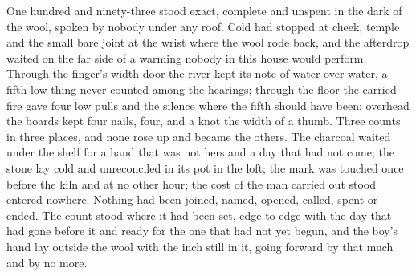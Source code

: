 One hundred and ninety-three stood exact, complete and unspent in the dark of the wool, spoken by nobody under any roof. Cold had stopped at cheek, temple and the small bare joint at the wrist where the wool rode back, and the afterdrop waited on the far side of a warming nobody in this house would perform. Through the finger's-width door the river kept its note of water over water, a fifth low thing never counted among the hearings; through the floor the carried fire gave four low pulls and the silence where the fifth should have been; overhead the boards kept four nails, four, and a knot the width of a thumb. Three counts in three places, and none rose up and became the others. The charcoal waited under the shelf for a hand that was not hers and a day that had not come; the stone lay cold and unreconciled in its pot in the loft; the mark was touched once before the kiln and at no other hour; the cost of the man carried out stood entered nowhere. Nothing had been joined, named, opened, called, spent or ended. The count stood where it had been set, edge to edge with the day that had gone before it and ready for the one that had not yet begun, and the boy's hand lay outside the wool with the inch still in it, going forward by that much and by no more.

